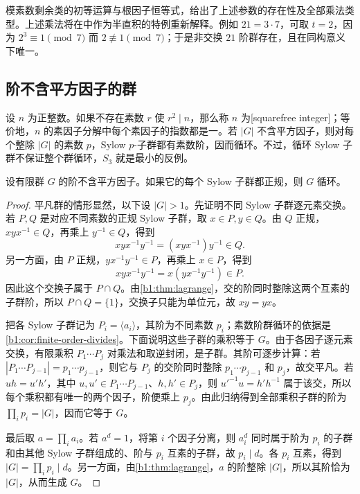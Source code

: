 模素数剩余类的初等运算与根因子恒等式，给出了上述参数的存在性及全部乘法类型。上述乘法将在中作为半直积的特例重新解释。例如 \(21=3\cdot7\)，可取 \(t=2\)，因为 \(2^3\equiv1\pmod7\) 而 \(2\not\equiv1\pmod7\)；于是非交换 \(21\) 阶群存在，且在同构意义下唯一。

\subsection{阶不含平方因子的群}
\label{b1:subsec:0503:02}

设 \(n\) 为正整数。如果不存在素数 \(r\) 使 \(r^2\mid n\)，那么称 \(n\) 为[squarefree integer]；等价地，\(n\) 的素因子分解中每个素因子的指数都是一。若 \(|G|\) 不含平方因子，则对每个整除 \(|G|\) 的素数 \(p\)，Sylow \(p\)-子群都有素数阶，因而循环。不过，循环 Sylow 子群不保证整个群循环，\(S_3\) 就是最小的反例。

\begin{proposition}\label{b1:prop:squarefree-normal-sylow}
	设有限群 \(G\) 的阶不含平方因子。如果它的每个 Sylow 子群都正规，则 \(G\) 循环。
\end{proposition}
\begin{proof}
	平凡群的情形显然，以下设 \(|G|>1\)。先证明不同 Sylow 子群逐元素交换。若 \(P,Q\) 是对应不同素数的正规 Sylow 子群，取 \(x\in P,y\in Q\)。由 \(Q\) 正规，\(xyx^{-1}\in Q\)，再乘上 \(y^{-1}\in Q\)，得到
	\[
		xyx^{-1}y^{-1}=(xyx^{-1})y^{-1}\in Q.
	\]
	另一方面，由 \(P\) 正规，\(yx^{-1}y^{-1}\in P\)，再乘上 \(x\in P\)，得到
	\[
		xyx^{-1}y^{-1}=x(yx^{-1}y^{-1})\in P.
	\]
	因此这个交换子属于 \(P\cap Q\)。由\cref{b1:thm:lagrange}，交的阶同时整除这两个互素的子群阶，所以 \(P\cap Q=\{1\}\)，交换子只能为单位元，故 \(xy=yx\)。

	把各 Sylow 子群记为 \(P_i=\langle a_i\rangle\)，其阶为不同素数 \(p_i\)；素数阶群循环的依据是\cref{b1:cor:finite-order-divides}。下面说明这些子群的乘积等于 \(G\)。由于各因子逐元素交换，有限乘积 \(P_1\cdots P_j\) 对乘法和取逆封闭，是子群。其阶可逐步计算：若 \(|P_1\cdots P_{j-1}|=p_1\cdots p_{j-1}\)，则它与 \(P_j\) 的交阶同时整除 \(p_1\cdots p_{j-1}\) 和 \(p_j\)，故交平凡。若 \(uh=u'h'\)，其中 \(u,u'\in P_1\cdots P_{j-1}\)、\(h,h'\in P_j\)，则 \(u'^{-1}u=h'h^{-1}\) 属于该交，所以每个乘积都有唯一的两个因子，阶便乘上 \(p_j\)。由此归纳得到全部乘积子群的阶为 \(\prod_i p_i=|G|\)，因而它等于 \(G\)。

	最后取 \(a=\prod_i a_i\)。若 \(a^d=1\)，将第 \(i\) 个因子分离，则 \(a_i^d\) 同时属于阶为 \(p_i\) 的子群和由其他 Sylow 子群组成的、阶与 \(p_i\) 互素的子群，故 \(p_i\mid d\)。各 \(p_i\) 互素，得到 \(|G|=\prod_i p_i\mid d\)。另一方面，由\cref{b1:thm:lagrange}，\(a\) 的阶整除 \(|G|\)，所以其阶恰为 \(|G|\)，从而生成 \(G\)。
\end{proof}

